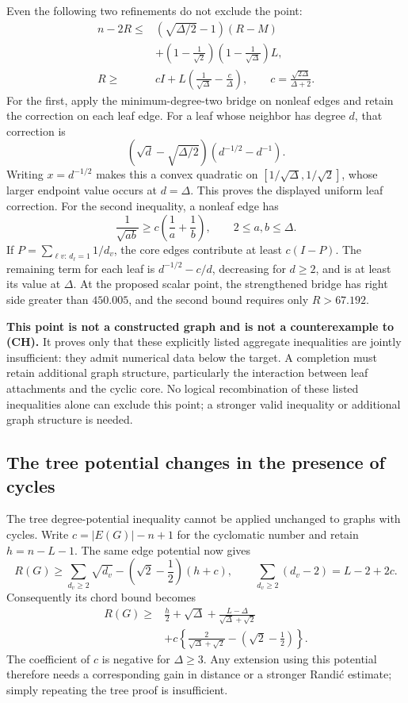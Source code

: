 \documentclass[11pt,a4paper]{article}
\theoremstyle{remark}
\numberwithin{equation}{section}
\begin{document}
Even the following two refinements do not exclude the point:
\[
\begin{split}
 n-2R\le {}&
 \left(\sqrt{\Delta/2}-1\right)(R-M)\\
 &+\left(1-\frac1{\sqrt2}\right)
          \left(1-\frac1{\sqrt\Delta}\right)L,\\
 R\ge {}& cI+
 L\left(\frac1{\sqrt\Delta}-\frac c\Delta\right),
 \qquad c=\frac{\sqrt{2\Delta}}{\Delta+2}.
\end{split}
\]
For the first, apply the minimum-degree-two bridge on nonleaf edges
and retain the correction on each leaf edge. For a leaf whose
neighbor has degree $d$, that correction is
\[
 (\sqrt d-\sqrt{\Delta/2})(d^{-1/2}-d^{-1}).
\]
Writing $x=d^{-1/2}$ makes this a convex quadratic on
$[1/\sqrt\Delta,1/\sqrt2]$, whose larger endpoint value occurs at
$d=\Delta$. This proves the displayed uniform leaf correction.
For the second inequality, a nonleaf edge has
\[
 \frac1{\sqrt{ab}}\ge c\left(\frac1a+\frac1b\right),
 \qquad 2\le a,b\le\Delta.
\]
If $P=\sum_{\ell v:\,d_\ell=1}1/d_v$, the core edges contribute at
least $c(I-P)$. The remaining term for each leaf is
$d^{-1/2}-c/d$, decreasing for $d\ge2$, and is at least its value
at $\Delta$.
At the proposed scalar point, the strengthened bridge has right side
greater than $450.005$, and the second bound requires only $R>67.192$.

\textbf{This point is not a constructed graph and is not a counterexample
to \textup{(CH)}.} It proves only that these explicitly listed aggregate
inequalities are jointly insufficient: they admit numerical data below
the target. A completion must retain additional graph structure,
particularly the interaction between leaf attachments and the cyclic
core. No logical recombination of these listed inequalities alone can exclude
this point; a stronger valid inequality or additional graph structure
is needed.

\subsection{The tree potential changes in the presence of cycles}

The tree degree-potential inequality cannot be applied unchanged to
graphs with cycles. Write $c=|E(G)|-n+1$ for the cyclomatic number and
retain $h=n-L-1$. The same edge potential now gives
\[
 R(G)\ge\sum_{d_v\ge2}\sqrt{d_v}
            -\left(\sqrt2-\frac12\right)(h+c),
 \qquad \sum_{d_v\ge2}(d_v-2)=L-2+2c.
\]
Consequently its chord bound becomes
\[
\begin{split}
 R(G)\ge{}&\frac h2+\sqrt\Delta+
                  \frac{L-\Delta}{\sqrt\Delta+\sqrt2}\\
 &+c\left\{\frac2{\sqrt\Delta+\sqrt2}
                         -\left(\sqrt2-\frac12\right)\right\}.
\end{split}
\]
The coefficient of $c$ is negative for $\Delta\ge3$. Any extension using
this potential therefore needs a corresponding gain in distance or a
stronger Randi\'c estimate; simply repeating the tree proof is insufficient.
\end{document}
